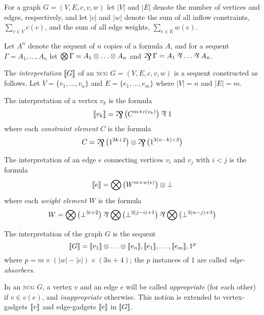 For a graph $G=(V,E,c,v,w)$ let $|V|$ and $|E|$ denote the number of vertices and edges, respectively, and let $|c|$ and $|w|$ denote the sum of all inflow constraints, $\sum_{v\in V}c(v)$, and the sum of all edge weights, $\sum_{e\in E}w(e)$.


Let $A^n$ denote the sequent of $n$ copies of a formula $A$, and for a sequent $\Gamma=A_1,\dotsc,A_n$ let $\bigotimes\Gamma=A_1\otimes\dotso\otimes A_n$ and $\bigparr\Gamma=A_1\parr\dotso\parr A_n$.



\begin{definition}
\label{def:graph interpretation}
The \emph{interpretation} $\llbracket G\rrbracket$ of an \textsc{ncg} $G=(V,E,c,v,w)$ is a sequent constructed as follows.
%
Let $V=\{v_1,\dotsc,v_n\}$ and $E=\{e_1,\dotsc,e_m\}$ where $|V|=n$ and $|E|=m$.

The interpretation of a vertex $v_k$ is the formula
\[
	\itn{v_k} = \bigparr\big(C^{m\times c(v_k)} \big)\parr 1
\]
where each \emph{constraint element} $C$ is the formula
\[
	C = \bigparr\big(1^{3k+2}\big) \tn \bigparr\big(1^{3(n-k)+3}\big)
\]

The interpretation of an edge $e$ connecting vertices $v_i$ and $v_j$ with $i<j$ is the formula
\[
	\llbracket e\rrbracket = \bigotimes\big(W^{m\times w(e)}\big)\otimes\bot
\]
where each \emph{weight element} $W$ is the formula
\[
	W = \bigotimes\big(\bot^{3i+2}\big)\parr\bigotimes\big(\bot^{3(j-i)+1}\big)\parr\bigotimes\big(\bot^{3(n-j)+3}\big)
\]

The interpretation of the graph $G$ is the sequent
\[
	\llbracket G\rrbracket = \llbracket v_1\rrbracket\otimes\dotso\otimes\llbracket v_n\rrbracket, \llbracket e_1\rrbracket,\dotsc,\llbracket e_m\rrbracket, 1^p
\]
where $p=m\times(|w|-|c|)\times(3n+4)$; the $p$ instances of $1$ are called \emph{edge-absorbers}.

\end{definition}



In an \textsc{ncg} $G$, a vertex $v$ and an edge $e$ will be called \emph{appropriate} (for each other) if $v\in v(e)$, and \emph{inappropriate} otherwise.
%
This notion is extended to vertex-gadgets $\llbracket v\rrbracket$ and edge-gadgets $\llbracket e\rrbracket$ in $\llbracket G\rrbracket$.



